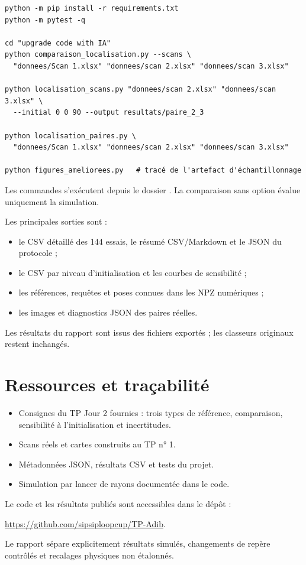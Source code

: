 \documentclass[11pt,a4paper]{article}
\newcommand{\code}[1]{\texttt{\detokenize{#1}}}
\begin{document}
\begin{lstlisting}
python -m pip install -r requirements.txt
python -m pytest -q

cd "upgrade code with IA"
python comparaison_localisation.py --scans \
  "donnees/Scan 1.xlsx" "donnees/scan 2.xlsx" "donnees/scan 3.xlsx"

python localisation_scans.py "donnees/scan 2.xlsx" "donnees/scan 3.xlsx" \
  --initial 0 0 90 --output resultats/paire_2_3

python localisation_paires.py \
  "donnees/Scan 1.xlsx" "donnees/scan 2.xlsx" "donnees/scan 3.xlsx"

python figures_ameliorees.py   # tracé de l'artefact d'échantillonnage
\end{lstlisting}
Les commandes s'exécutent depuis le dossier \code{upgrade code with IA}.
La comparaison sans option \code{--scans} évalue uniquement la simulation.

Les principales sorties sont :
\begin{itemize}
\item le CSV détaillé des 144 essais, le résumé CSV/Markdown et le JSON
du protocole ;
\item le CSV par niveau d'initialisation et les courbes de sensibilité ;
\item les références, requêtes et poses connues dans les NPZ numériques ;
\item les images et diagnostics JSON des paires réelles.
\end{itemize}
Les résultats du rapport sont issus des fichiers exportés ; les classeurs
originaux restent inchangés.

\section{Ressources et traçabilité}
\begin{itemize}
\item Consignes du TP Jour 2 fournies : trois types de référence,
comparaison, sensibilité à l'initialisation et incertitudes.
\item Scans réels et cartes construits au TP n° 1.
\item Métadonnées JSON, résultats CSV et tests du projet.
\item Simulation par lancer de rayons documentée dans le code.
\end{itemize}
Le code et les résultats publiés sont accessibles dans le dépôt :

\url{https://github.com/sipsiploopcup/TP-Adib}.

Le rapport sépare explicitement résultats simulés, changements de repère
contrôlés et recalages physiques non étalonnés.
\end{document}
